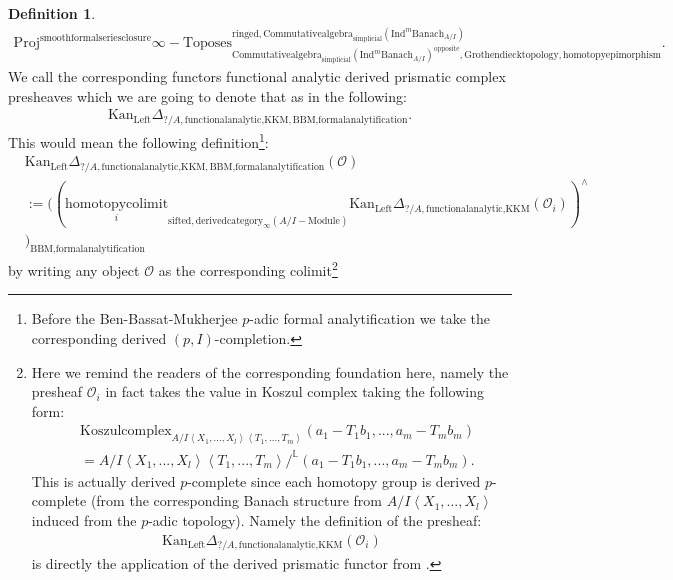 \documentclass[11pt]{book}
\theoremstyle{definition}
\newtheorem{definition}[theorem]{Definition}
\numberwithin{equation}{section}
\begin{document}
\begin{definition}
\begin{align}
\mathrm{Proj}^\text{smoothformalseriesclosure}\infty-\mathrm{Toposes}^{\mathrm{ringed},\mathrm{Commutativealgebra}_{\mathrm{simplicial}}(\mathrm{Ind}^m\mathrm{Banach}_{A/I})}_{\mathrm{Commutativealgebra}_{\mathrm{simplicial}}(\mathrm{Ind}^m\mathrm{Banach}_{A/I})^\mathrm{opposite},\mathrm{Grothendiecktopology,homotopyepimorphism}}. 
\end{align}
We call the corresponding functors functional analytic derived prismatic complex presheaves which we are going to denote that as in the following:
\begin{align}
\mathrm{Kan}_{\mathrm{Left}}\Delta_{?/A,\text{functionalanalytic,KKM},\text{BBM,formalanalytification}}.	
\end{align}
This would mean the following definition{\footnote{Before the Ben-Bassat-Mukherjee $p$-adic formal analytification we take the corresponding derived $(p,I)$-completion.}}:
\begin{align}
&\mathrm{Kan}_{\mathrm{Left}}\Delta_{?/A,\text{functionalanalytic,KKM},\text{BBM,formalanalytification}}(\mathcal{O})\\
&:=	((\underset{i}{\text{homotopycolimit}}_{\text{sifted},\text{derivedcategory}_{\infty}(A/I-\text{Module})}\mathrm{Kan}_{\mathrm{Left}}\Delta_{?/A,\text{functionalanalytic,KKM}}(\mathcal{O}_i))^\wedge\\
&)_\text{BBM,formalanalytification}
\end{align}
by writing any object $\mathcal{O}$ as the corresponding colimit\footnote{Here we remind the readers of the corresponding foundation here, namely the presheaf $\mathcal{O}_i$ in fact takes the value in Koszul complex taking the following form:
\begin{align}
&\mathrm{Koszulcomplex}_{A/I\left<X_1,...,X_l\right>\left<T_1,...,T_m\right>}(a_1-T_1b_1,...,a_m-T_mb_m)\\
&= A/I\left<X_1,...,X_l\right>\left<T_1,...,T_m\right>/^\mathbb{L}(a_1-T_1b_1,...,a_m-T_mb_m).	
\end{align}
This is actually derived $p$-complete since each homotopy group is derived $p$-complete (from the corresponding Banach structure from $A/I\left<X_1,...,X_l\right>$ induced from the $p$-adic topology). Namely the definition of the presheaf:
\begin{align}
\mathrm{Kan}_{\mathrm{Left}}\Delta_{?/A,\text{functionalanalytic,KKM}}(\mathcal{O}_i)	
\end{align}
is directly the application of the derived prismatic functor from \cite[Construction 7.6]{12BS}.} 
\begin{center}

\end{center}
\end{definition}
\end{document}
